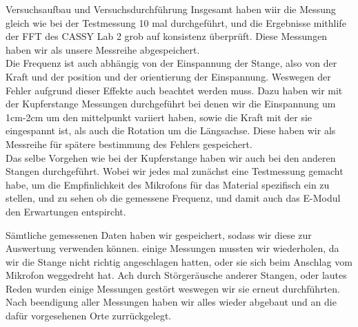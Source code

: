\documentclass[twoside]{protokoll}
\begin{document}
\begin{aufgabe}{Versuchsaufbau und Versuchsdurchführung}
Insgesamt haben wiir die Messung gleich wie bei der Testmessung 10 mal durchgeführt, und die Ergebnisse mithlife der FFT des CASSY Lab 2 grob auf konsistenz überprüft. Diese Messungen haben wir als unsere Messreihe abgespeichert.\\

Die Frequenz ist auch abhängig von der Einspannung der Stange, also von der Kraft und der position und der orientierung der Einspannung. Weswegen der Fehler aufgrund dieser Effekte auch beachtet werden muss. Dazu haben wir mit der Kupferstange Messungen durchgeführt bei denen wir die Einspannung um 1cm-2cm um den mittelpunkt variiert haben, sowie die Kraft mit der sie eingespannt ist, als auch die Rotation um die Längsachse.
Diese haben wir als Messreihe für spätere bestimmung des Fehlers gespeichert.\\

Das selbe Vorgehen wie bei der Kupferstange haben wir auch bei den anderen Stangen durchgeführt. Wobei wir jedes mal zunächst eine Testmessung gemacht habe, um die Empfinlichkeit des Mikrofons für das Material spezifisch ein zu stellen, und zu sehen ob die gemessene Frequenz, und damit auch das E-Modul den Erwartungen entspircht. 

Sämtliche gemessenen Daten haben wir gespeichert, sodass wir diese zur Auswertung verwenden können. einige Messungen mussten wir wiederholen, da wir die Stange nicht richtig angeschlagen hatten, oder sie sich beim Anschlag vom Mikrofon weggedreht hat. Ach durch Störgeräusche anderer Stangen, oder lautes Reden wurden einige Messungen gestört weswegen wir sie erneut durchführten.\\

Nach beendigung aller Messungen haben wir alles wieder abgebaut und an die dafür vorgesehenen Orte zurrückgelegt. 



  
\end{aufgabe}
\end{document}
